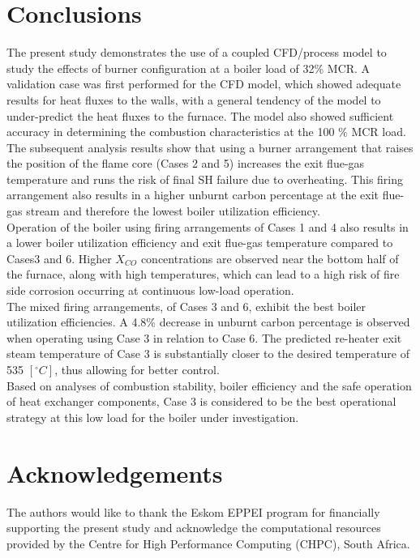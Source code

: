 \documentclass[review]{elsarticle}
\begin{document}
\section{Conclusions}
The present study demonstrates the use of a coupled CFD/process model to study the effects of burner configuration at a boiler load of 32\% MCR. A validation case was first performed for the CFD model, which showed adequate results for heat fluxes to the walls, with a general tendency of the model to under-predict the heat fluxes to the furnace. The model also showed sufficient accuracy in determining the combustion characteristics at the 100 \% MCR load. \\

The subsequent analysis results show that using a burner arrangement that raises the position of the flame core (Cases 2 and 5) increases the exit flue-gas temperature and runs the risk of final SH failure due to overheating. This firing arrangement also results in a higher unburnt carbon percentage at the exit flue-gas stream and therefore the lowest boiler utilization efficiency.\\

Operation of the boiler using firing arrangements of Cases 1 and 4 also results in a lower boiler utilization efficiency and exit flue-gas temperature compared to Cases3 and 6. Higher $X_{CO}$ concentrations are observed near the bottom half of the furnace, along with high temperatures, which can lead to a high risk of fire side corrosion occurring at continuous low-load operation.\\

The mixed firing arrangements, of Cases 3 and 6, exhibit the best boiler utilization efficiencies. A 4.8\% decrease in unburnt carbon percentage is observed when operating using Case 3 in relation to Case 6. The predicted re-heater exit steam temperature of Case 3 is substantially closer to the desired temperature of 535 $[^\circ C]$, thus allowing for better control.\\

Based on analyses of combustion stability, boiler efficiency and the safe operation of heat exchanger components, Case 3 is considered to be the best operational strategy at this low load for the boiler under investigation.

\section*{Acknowledgements}
The authors would like to thank the Eskom EPPEI program for financially supporting the present study and acknowledge the computational resources provided by the Centre for High Performance Computing (CHPC), South Africa.


\end{document}

